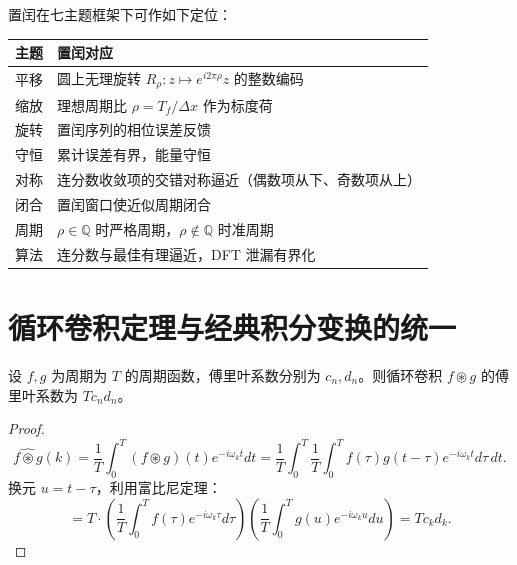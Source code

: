 \begin{remark}[与本章七主题的对应]\label{rem:intercalation_seven_themes}
置闰在七主题框架下可作如下定位：
\begin{center}
\begin{tabular}{@{}p{2.2cm}p{10.5cm}@{}}
\toprule
主题 & 置闰对应 \\
\midrule
平移 & 圆上无理旋转 \(R_\rho:z\mapsto e^{i2\pi\rho}z\) 的整数编码 \\
缩放 & 理想周期比 \(\rho=T_f/\Delta x\) 作为标度荷 \\
旋转 & 置闰序列的相位误差反馈 \\
守恒 & 累计误差有界，能量守恒 \\
对称 & 连分数收敛项的交错对称逼近（偶数项从下、奇数项从上） \\
闭合 & 置闰窗口使近似周期闭合 \\
周期 & \(\rho\in\mathbb{Q}\) 时严格周期，\(\rho\notin\mathbb{Q}\) 时准周期 \\
算法 & 连分数与最佳有理逼近，DFT 泄漏有界化 \\
\bottomrule
\end{tabular}
\end{center}
\end{remark}

\section{\texorpdfstring{循环卷积定理与经典积分变换的统一}{循环卷积定理与经典积分变换的统一}}

\begin{theorem}[循环卷积定理]\label{thm:circular_convolution_theorem}
设 $f, g$ 为周期为 $T$ 的周期函数，傅里叶系数分别为 $c_n, d_n$。则循环卷积 $f \circledast g$ 的傅里叶系数为 $T c_n d_n$。
\end{theorem}

\begin{proof}
\[
\widehat{f \circledast g}(k) = \frac{1}{T}\int_0^T (f \circledast g)(t) e^{-i\omega_k t} dt
= \frac{1}{T}\int_0^T \frac{1}{T}\int_0^T f(\tau) g(t-\tau) e^{-i\omega_k t} d\tau\, dt.
\]
换元 $u = t - \tau$，利用富比尼定理：
\[
= T \cdot \left(\frac{1}{T}\int_0^T f(\tau) e^{-i\omega_k \tau} d\tau\right)\left(\frac{1}{T}\int_0^T g(u) e^{-i\omega_k u} du\right) = T c_k d_k.
\]
\end{proof}

